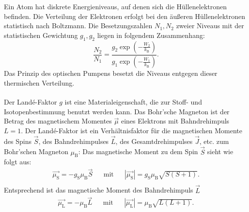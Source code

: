 %
Ein Atom hat diskrete Energieniveaus, auf denen sich die Hüllenelektronen befinden.
Die Verteilung der Elektronen erfolgt bei den äußeren Hüllenelektronen statistisch nach Boltzmann.
Die Besetzungszahlen $N_{1}, N_{2}$ zweier Niveaus mit der statistischen Gewichtung $g_{1}, g_{2}$ liegen in folgendem Zusammenhang:
\begin{equation*}
  \frac{N_{2}}{N_{1}} = \frac{ g_{2} \exp{  \left( -\frac{W_{2}}{k_{\text{B}}}  \right) }}{ g_{1} \exp{ \left( -\frac{W_{1}}{k_{\text{B}}} \right) }}.
\end{equation*}
Das Prinzip des optischen Pumpens besetzt die Niveaus entgegen dieser thermischen Verteilung.\\
%
%
\\Der Landé-Faktor $g$ ist eine Materialeigenschaft, die zur Stoff- und Isotopenbestimmung benutzt werden kann.
Das Bohr'sche Magneton ist der Betrag des magnetischem Momentes $\vec{\mu}$ eines Elektrons mit Bahndrehimpuls $L=1$.
Der Landé-Faktor ist ein Verhältnisfaktor für die magnetischen Momente des Spins $\vec{S}$, des Bahndrehimpulses $\vec{L}$, des Gesamtdrehimpulses $\vec{J}$, etc. zum Bohr'schen Magneton $\mu_{\text{B}}$:
Das magnetische Moment zu dem Spin $\vec{S}$ sieht wie folgt aus:
\begin{align*}
  \vec{\mu_{\text{S}}} = - g_{\text{S}} \mu_{\text{B}} \vec{S} && \text{mit} && |\vec{\mu_{\text{S}}}|= g_{\text{S}} \mu_{\text{B}} \sqrt{S(S+1)}.\\
\end{align*}
Entsprechend ist das magnetische Moment des Bahndrehimpuls $\vec{L}$
\begin{align*}
  \vec{\mu_{\text{L}}} = - \mu_{\text{B}} \vec{L} && \text{mit} && |\vec{\mu_{\text{L}}}|= \mu_{\text{B}} \sqrt{L(L+1)}.
\end{align*}
